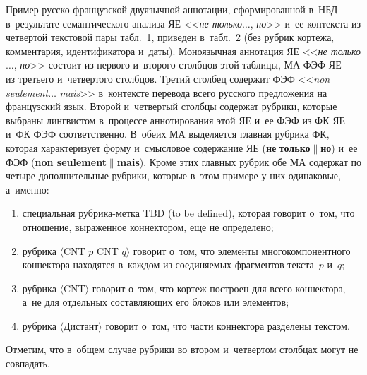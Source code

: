 \begin{multicols}{2}
   \smallskip
   
   Пример русско-фран\-цуз\-ской двуязычной аннотации, сформированной в~НБД в~результате семантического анализа ЯЕ <<\textit{не только}$\ldots$, 
\textit{но}>> и~ее контекста из четвертой текстовой пары табл.~1, приведен 
в~табл.~2 (без рубрик кортежа, комментария, идентификатора и~даты). Моноязычная аннотация 
ЯЕ 
<<\textit{не только}$\ldots$, \textit{но}>> состоит из первого и~второго 
столбцов этой таблицы, МА ФЭФ ЯЕ~--- из третьего и~четвертого столбцов. 
Третий столбец содержит ФЭФ <<\textit{non seulement}$\ldots$ \textit{mais}>> 
в~контексте перевода всего русского предложения на французский язык. 
Второй и~чет\-вер\-тый столбцы содержат рубрики, которые выбраны лингвистом 
в~процессе аннотирования этой ЯЕ и~ее ФЭФ из ФК ЯЕ и~ФК ФЭФ 
соответственно. В~обеих МА выделяется главная руб\-ри\-ка ФК, которая 
характеризует форму и~смыс\-ло\-вое содержание ЯЕ 
(\textbf{не} \textbf{только}$\|$\textbf{но}) и~ее ФЭФ (\textbf{non 
seulement}$\|$\textbf{mais}). Кроме этих главных рубрик обе МА содержат по 
четыре дополнительные руб\-ри\-ки, которые в~этом примере у них одинаковые,\linebreak 
а~\mbox{именно:}
   \begin{enumerate}[(1)]
\item специальная руб\-ри\-ка-мет\-ка TBD (to be defined), которая говорит 
о~том, что отношение, выраженное коннектором, еще не определено; %
\item рубрика $\langle$CNT $p$ CNT $q$$\rangle$ говорит о~том, что 
элементы многокомпонентного коннектора находятся в~каждом из 
соединяемых фрагментов текста~$p$ и~$q$; %
\item рубрика $\langle$CNT$\rangle$ говорит о~том, что кортеж построен для всего 
коннектора, а~не для отдельных составляющих его блоков или 
элементов; %
\item рубрика $\langle$Дистант$\rangle$ говорит о~том, что части 
коннектора разделены текстом.
\end{enumerate}

   Отметим, что в~общем случае рубрики во втором и~четвертом столбцах 
могут не совпадать.
   

     
  

\end{multicols}
